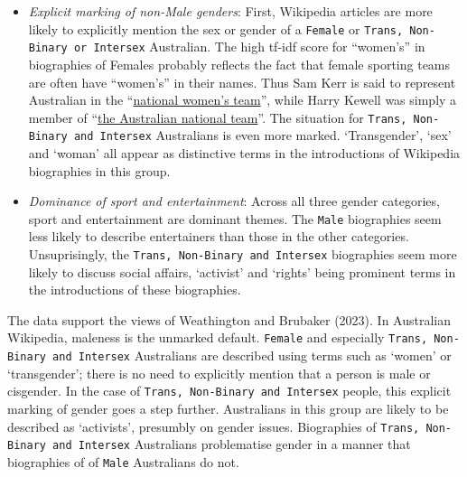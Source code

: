 \documentclass[
  a4paper,
  DIV=11,
  numbers=noendperiod]{scrreprt}
\providecommand{\tightlist}{%
  \setlength{\itemsep}{0pt}\setlength{\parskip}{0pt}}\usepackage{longtable,booktabs,array}
\begin{document}
\begin{itemize}
\tightlist
\item
  \emph{Explicit marking of non-Male genders}: First, Wikipedia articles
  are more likely to explicitly mention the sex or gender of a
  \texttt{Female} or \texttt{Trans,\ Non-Binary\ or\ Intersex}
  Australian. The high tf-idf score for ``women's'' in biographies of
  Females probably reflects the fact that female sporting teams are
  often have ``women's'' in their names. Thus Sam Kerr is said to
  represent Australian in the
  ``\href{https://en.wikipedia.org/w/index.php?title=Sam_Kerr\&oldid=1174642959}{national
  women's team}'', while Harry Kewell was simply a member of
  ``\href{https://en.wikipedia.org/w/index.php?title=Harry_Kewell\&oldid=1177164031}{the
  Australian national team}''. The situation for
  \texttt{Trans,\ Non-Binary\ and\ Intersex} Australians is even more
  marked. `Transgender', `sex' and `woman' all appear as distinctive
  terms in the introductions of Wikipedia biographies in this group.
\item
  \emph{Dominance of sport and entertainment}: Across all three gender
  categories, sport and entertainment are dominant themes. The
  \texttt{Male} biographies seem less likely to describe entertainers
  than those in the other categories. Unsuprisingly, the
  \texttt{Trans,\ Non-Binary\ and\ Intersex} biographies seem more
  likely to discuss social affairs, `activist' and `rights' being
  prominent terms in the introductions of these biographies.
\end{itemize}

The data support the views of Weathington and Brubaker (2023). In
Australian Wikipedia, maleness is the unmarked default. \texttt{Female}
and especially \texttt{Trans,\ Non-Binary\ and\ Intersex} Australians
are described using terms such as `women' or `transgender'; there is no
need to explicitly mention that a person is male or cisgender. In the
case of \texttt{Trans,\ Non-Binary\ and\ Intersex} people, this explicit
marking of gender goes a step further. Australians in this group are
likely to be described as `activists', presumbly on gender issues.
Biographies of \texttt{Trans,\ Non-Binary\ and\ Intersex} Australians
problematise gender in a manner that biographies of of \texttt{Male}
Australians do not.
\end{document}
